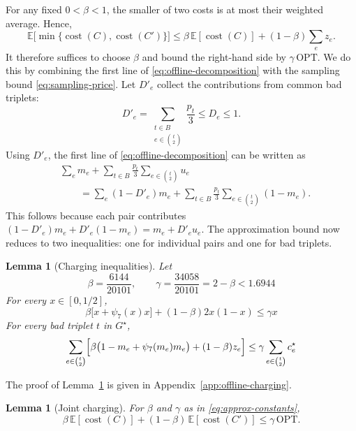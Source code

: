 \documentclass[11pt]{article}
\newtheorem{lemma}[theorem]{Lemma}
\theoremstyle{definition}
\theoremstyle{remark}
\newcommand{\1}{\mathbf{1}}
\begin{document}
For any fixed $0<\beta<1$, the smaller of two costs is at most
their weighted average. Hence,
\[
    \mathbb{E}\bigl[\min\{\operatorname{cost}(C),
                          \operatorname{cost}(C')\}\bigr]
    \leq
    \beta\,\mathbb{E}[\operatorname{cost}(C)]
    +(1-\beta)\sum_e z_e.
\]
It therefore suffices to choose $\beta$ and bound the right-hand
side by $\gamma\,\mathrm{OPT}$.
We do this by combining the first line of
\eqref{eq:offline-decomposition} with the sampling bound
\eqref{eq:sampling-price}. Let $D'_e$ collect the contributions from common bad triplets:
\[
    D'_e
    =\sum_{\substack{t\in B\\e\in\binom{t}{2}}}\frac{p_t}{3}
    \leq D_e\leq1.
\]
Using $D'_e$, the first line of \eqref{eq:offline-decomposition}
can be written as
\begin{align*}
    &\sum_e m_e+\sum_{t\in B}\frac{p_t}{3}
        \sum_{e\in\binom{t}{2}}u_e\\
    &\qquad=\sum_e(1-D'_e)m_e
      +\sum_{t\in B}\frac{p_t}{3}
       \sum_{e\in\binom{t}{2}}(1-m_e).
\end{align*}
This follows because each pair contributes
$(1-D'_e)m_e+D'_e(1-m_e)=m_e+D'_eu_e$. The approximation bound now reduces to two inequalities: one for individual pairs and one for bad triplets.

\begin{lemma}[Charging inequalities]
\label{lem:charging-inequalities}
Let
\begin{equation}
    \beta=\frac{6144}{20101},
    \qquad
    \gamma=\frac{34058}{20101}=2-\beta<1.6944
    \label{eq:approx-constants}
\end{equation}
For every $x\in[0,1/2]$,
\begin{equation}
    \beta\bigl[x+\psi_7(x)x\bigr]
    +(1-\beta)2x(1-x)
    \leq\gamma x
    \label{eq:joint-pair}
\end{equation}
For every bad triplet $t$ in $G^\star$,
\begin{equation}
    \sum_{e\in\binom{t}{2}}
    \Bigl[
        \beta\bigl(1-m_e+\psi_7(m_e)m_e\bigr)
        +(1-\beta)z_e
    \Bigr]
    \leq\gamma\sum_{e\in\binom{t}{2}}c_e^\star
    \label{eq:joint-triplet}
\end{equation}
\end{lemma}

The proof of Lemma~\ref{lem:charging-inequalities} is given in
Appendix~\ref{app:offline-charging}.

\begin{lemma}[Joint charging]
\label{lem:joint-charging}
For $\beta$ and $\gamma$ as in \eqref{eq:approx-constants},
\[
    \beta\,\mathbb{E}[\operatorname{cost}(C)]
    +(1-\beta)\,\mathbb{E}[\operatorname{cost}(C')]
    \leq\gamma\,\mathrm{OPT}.
\]
\end{lemma}
\end{document}
